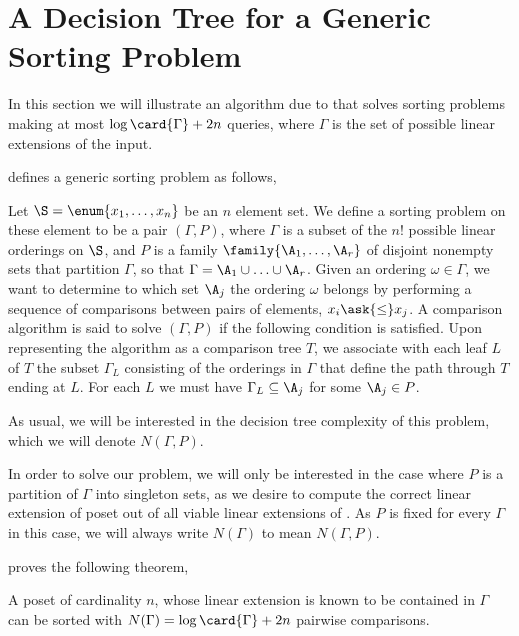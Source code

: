 \section{A Decision Tree for a Generic Sorting Problem}
\label{tree:xy:dt}

In this section we will illustrate an algorithm due to \citet*{fredman:1976}
that solves sorting problems making at most $\log\card{\Gamma} + 2n$ queries,
where $\Gamma$ is the set of possible linear extensions of the input.

\citet{fredman:1976} defines a generic sorting problem as follows,

\begin{problem}
Let $\S = \enum{x_1, \ldots, x_n}$ be an $n$ element set. We define a sorting
problem on these element to be a pair $(\Gamma, P)$, where $\Gamma$ is a
subset of the $n!$ possible linear orderings on $\S$, and
$P$ is a family $\family{\A_1, \ldots, \A_r}$ of disjoint nonempty sets that
partition $\Gamma$, so that $\Gamma = \A_1 \cup \ldots \cup \A_r$. Given an
ordering $\omega \in \Gamma$, we want to determine to which set $\A_j$ the
ordering $\omega$ belongs by performing a sequence of comparisons between
pairs of elements, $x_i \ask{\le} x_j$. A comparison algorithm is said to
solve $(\Gamma, P)$ if the following condition is satisfied. Upon representing
the algorithm as a comparison tree $T$, we associate with each leaf $L$ of $T$
the subset $\Gamma_L$ consisting of the orderings in $\Gamma$ that define the
path through $T$ ending at $L$. For each $L$ we must have $\Gamma_L \subseteq
\A_j$ for some $\A_j \in P$.
\end{problem}

As usual, we will be interested in the decision tree complexity of this
problem, which we will denote $N(\Gamma, P)$.

In order to solve our \XY problem, we will only be interested in the case
where $P$ is a partition of $\Gamma$ into singleton sets, as we desire to
compute the correct linear extension of poset \XY out of all viable linear
extensions of \XY. As $P$ is fixed for every $\Gamma$ in this case, we will
always write $N(\Gamma)$ to mean $N(\Gamma, P)$.

\citet{fredman:1976} proves the following theorem,

\begin{theorem}\label{theorem:fredman:1976}
A poset of cardinality $n$, whose linear extension is known to be contained in
$\Gamma$ can be sorted with $N(\Gamma) = \log \card{\Gamma} + 2n$ pairwise
comparisons.
\end{theorem}

